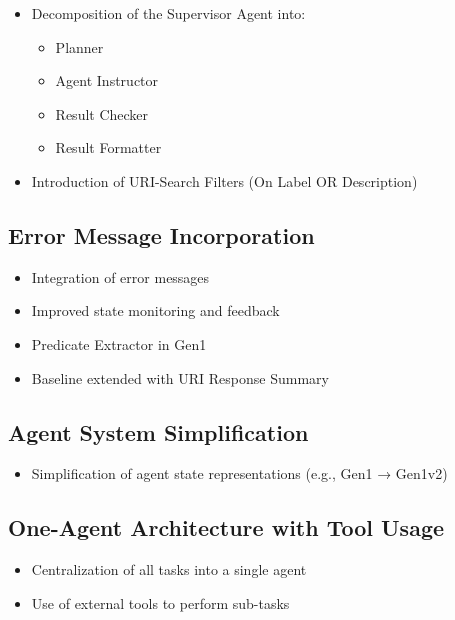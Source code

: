 \documentclass[a4paper,oneside,bibliography=totoc]{scrbook}
\begin{document}
\begin{itemize}
  \item Decomposition of the Supervisor Agent into:
        \begin{itemize}
          \item Planner
          \item Agent Instructor
          \item Result Checker
          \item Result Formatter
        \end{itemize}

  \item Introduction of URI-Search Filters (On Label OR Description)
\end{itemize}

\subsection{Error Message Incorporation}
\label{subsec:error_message_incorporation}
\begin{itemize}
  \item Integration of error messages
  \item Improved state monitoring and feedback
  \item Predicate Extractor in Gen1
  \item Baseline extended with URI Response Summary
\end{itemize}

\subsection{Agent System Simplification}
\label{subsec:task_simplification_state_refinement}
\begin{itemize}
  \item Simplification of agent state representations (e.g., Gen1 → Gen1v2)
\end{itemize}

\subsection{One-Agent Architecture with Tool Usage}
\label{subsec:one_agent_architecture_tool_usage}
\begin{itemize}
  \item Centralization of all tasks into a single agent
  \item Use of external tools to perform sub-tasks
\end{itemize}
\end{document}

